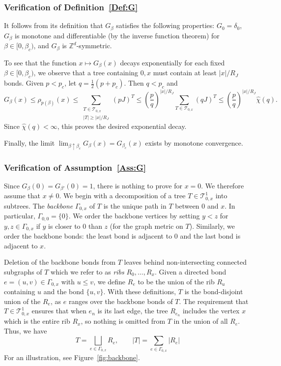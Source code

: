 \documentclass[11pt,a4paper]{article}
\numberwithin{equation}{section}
\theoremstyle{plain}
\theoremstyle{definition}
\newcommand\1{\mathds{1}}
\begin{document}
\subsubsection{Verification of Definition~\ref{Def:G}}


It follows from its definition that $G_\beta$ satisfies the following properties: $G_0=\delta_0$, $G_\beta$ is monotone and differentiable
 (by the inverse function theorem) for $\beta\in [0,\beta_c)$, and $G_\beta$ is $\mathbb Z^d$-symmetric.


To see that the function $x \mapsto G_\beta(x)$ decays exponentially
for each fixed $\beta\in [0,\beta_c)$,
we observe that
a tree containing $0,x$ must contain at least $|x|/R_J$ bonds.
Given $p<p_c$, let $q=\frac12 (p+p_c)$.  Then $q<p_c$ and
\begin{equation}
    G_\beta(x) \le \rho_{p(\beta)}(x) \le
    \sum_{\substack{T \in \mathcal{T}_{0,x} \\ |T| \ge |x|/R_J}} (pJ)^T
    \le
    \left(\frac{p}{q}\right)^{|x|/R_J} \sum_{T \in \mathcal{T}_{0,x}} (qJ)^T
    \le
    \left(\frac{p}{q}\right)^{|x|/R_J} \hat\chi(q).
\end{equation}
Since $\hat{\chi}(q)<\infty$, this proves the desired exponential decay.


Finally, the limit $\lim_{\beta \uparrow \beta_c}G_{\beta}(x) = G_{\beta_c}(x)$
exists by monotone convergence.

\subsubsection{Verification of Assumption~\ref{Ass:G}}

Since $G_\beta(0)=G_{\beta'}(0)=1$,
there is nothing to prove for $x=0$.  We therefore assume that $x\neq 0$.
We begin with a decomposition of  a tree $T \in \mathcal{T}^1_{0,x}$
into subtrees.
The \emph{backbone} $\Gamma_{0,x}$ of $T$ is
the unique path in $T$ between $0$ and $x$.
In particular, $\Gamma_{0,0}=\{0\}$.
We order the backbone vertices by setting $y<z$
for $y,z \in \Gamma_{0,x}$ if $y$ is closer to $0$ than $z$ (for the graph metric on $T$).
Similarly, we order the backbone bonds:
the least bond is adjacent to $0$ and the
last bond is adjacent to $x$.

Deletion of the backbone bonds from $T$ leaves
behind non-intersecting connected subgraphs of $T$
which we refer to as \emph{ribs} $R_0, \ldots, R_{x}$.
Given a directed bond $e = (u,v) \in \Gamma_{0,x}$ with $u \leq v$,
we define $R_e$ to be the union of the rib $R_u$ containing $u$
and the bond $\{u,v\}$.
With these definitions, $T$ is the bond-disjoint union of the $R_e$, as $e$ ranges over the
backbone bonds of $T$. The requirement that $T\in \mathcal{T}^1_{0,x}$ ensures that
when $e_n$ is its last edge, the tree $R_{e_n}$ includes  the vertex $x$ which is
the entire rib $R_x$, so nothing is omitted from $T$ in the union of all $R_e$.
Thus, we have
\begin{equation}
\label{eq:Tdecomp}
    T = \bigsqcup_{e \in \Gamma_{0,x}} R_e ,
    \qquad |T| = \sum_{e \in \Gamma_{0,x}}|R_{e} |
\end{equation}
For an illustration, see Figure~\ref{fig:backbone}.
\end{document}
